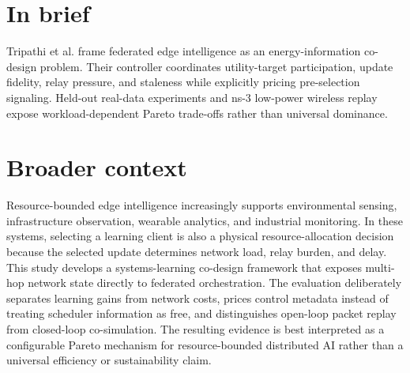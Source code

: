 \documentclass[11pt]{article}
\begin{document}
\section*{In brief}
Tripathi et al. frame federated edge intelligence as an energy-information co-design problem. Their controller coordinates utility-target participation, update fidelity, relay pressure, and staleness while explicitly pricing pre-selection signaling. Held-out real-data experiments and ns-3 low-power wireless replay expose workload-dependent Pareto trade-offs rather than universal dominance.\par
\section*{Broader context}
Resource-bounded edge intelligence increasingly supports environmental sensing, infrastructure observation, wearable analytics, and industrial monitoring. In these systems, selecting a learning client is also a physical resource-allocation decision because the selected update determines network load, relay burden, and delay. This study develops a systems-learning co-design framework that exposes multi-hop network state directly to federated orchestration. The evaluation deliberately separates learning gains from network costs, prices control metadata instead of treating scheduler information as free, and distinguishes open-loop packet replay from closed-loop co-simulation. The resulting evidence is best interpreted as a configurable Pareto mechanism for resource-bounded distributed AI rather than a universal efficiency or sustainability claim.\par
\end{document}
